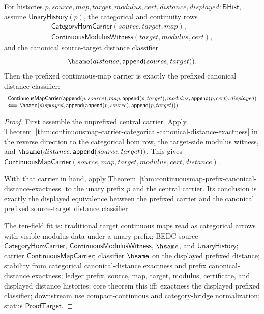 \begin{theorem}
\label{thm:continuousmap-prefixed-categorical-canonical-distance-exactness}
For histories
$p,source,map,target,modulus,cert,distance,displayed:\mathsf{BHist}$, assume
$\mathsf{UnaryHistory}(p)$, the categorical and continuity rows
$$
\begin{array}{l}
\mathsf{CategoryHomCarrier}(source,target,map),\\
\mathsf{ContinuousModulusWitness}(target,modulus,cert),
\end{array}
$$
and the canonical source-target distance classifier
$$
\hsame(distance,\mathsf{append}(source,target)).
$$
Then the prefixed continuous-map carrier is exactly the prefixed canonical
distance classifier:
$$
\begin{array}{l}
\mathsf{ContinuousMapCarrier}
(\mathsf{append}(p,source),map,\mathsf{append}(p,target),modulus,
\mathsf{append}(p,cert),displayed)\\
\Longleftrightarrow
\hsame(displayed,
\mathsf{append}(\mathsf{append}(p,source),\mathsf{append}(p,target))).
\end{array}
$$
\end{theorem}
\begin{proof}
First assemble the unprefixed central carrier. Apply
Theorem~\ref{thm:continuousmap-carrier-categorical-canonical-distance-exactness}
in the reverse direction to the categorical hom row, the
target-side modulus witness, and
$\hsame(distance,\mathsf{append}(source,target))$. This gives
$\mathsf{ContinuousMapCarrier}(source,map,target,modulus,cert,distance)$.

With that carrier in hand, apply
Theorem~\ref{thm:continuousmap-prefix-canonical-distance-exactness} to the
unary prefix $p$ and the central carrier. Its conclusion is exactly the
displayed equivalence between the prefixed carrier and the canonical prefixed
source-target distance classifier.

The ten-field fit is: traditional target continuous maps read as categorical
arrows with visible modulus data under a unary prefix; BEDC source
$\mathsf{CategoryHomCarrier}$, $\mathsf{ContinuousModulusWitness}$, $\hsame$,
and $\mathsf{UnaryHistory}$; carrier $\mathsf{ContinuousMapCarrier}$;
classifier $\hsame$ on the displayed prefixed distance; stability from
categorical canonical-distance exactness and prefix canonical-distance
exactness; ledger prefix, source, map, target, modulus, certificate, and
displayed distance histories; core theorem this iff; exactness the displayed
prefixed classifier; downstream use compact-continuous and category-bridge
normalization; status $\mathsf{ProofTarget}$.
\end{proof}


